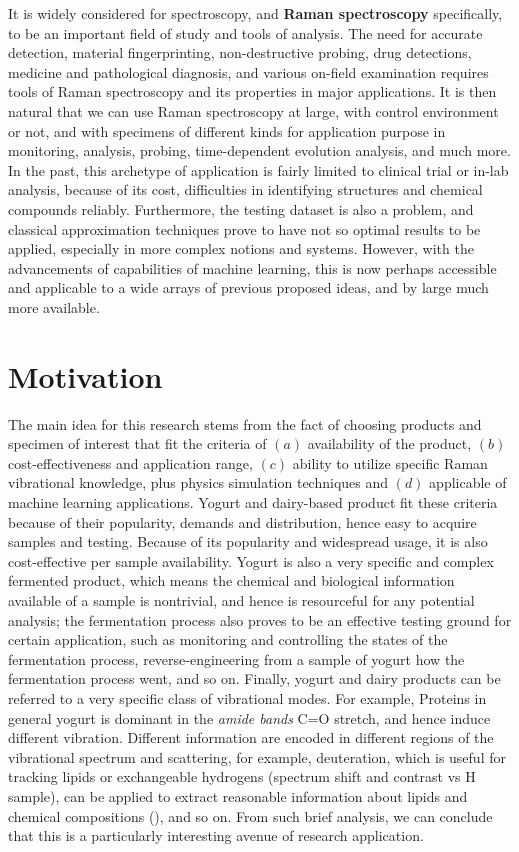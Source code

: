 \documentclass{iopjournal}
\begin{document}
It is widely considered for spectroscopy, and \textbf{Raman spectroscopy} specifically, to be an important field of study and tools of analysis. The need for accurate detection, material fingerprinting, non-destructive probing, drug detections, medicine and pathological diagnosis, and various on-field examination requires tools of Raman spectroscopy and its properties in major applications. It is then natural that we can use Raman spectroscopy at large, with control environment or not, and with specimens of different kinds for application purpose in monitoring, analysis, probing, time-dependent evolution analysis, and much more. In the past, this archetype of application is fairly limited to clinical trial or in-lab analysis, because of its cost, difficulties in identifying structures and chemical compounds reliably. Furthermore, the testing dataset is also a problem, and classical approximation techniques prove to have not so optimal results to be applied, especially in more complex notions and systems. However, with the advancements of capabilities of machine learning, this is now perhaps accessible and applicable to a wide arrays of previous proposed ideas, and by large much more available. 
\section{Motivation}

The main idea for this research stems from the fact of choosing products and specimen of interest that fit the criteria of $(a)$ availability of the product, $(b)$ cost-effectiveness and application range, $(c)$ ability to utilize specific Raman vibrational knowledge, plus physics simulation techniques and $(d)$ applicable of machine learning applications. Yogurt and dairy-based product fit these criteria because of their popularity, demands and distribution, hence easy to acquire samples and testing. Because of its popularity and widespread usage, it is also cost-effective per sample availability. Yogurt is also a very specific and complex fermented product, which means the chemical and biological information available of a sample is nontrivial, and hence is resourceful for any potential analysis; the fermentation process also proves to be an effective testing ground for certain application, such as monitoring and controlling the states of the fermentation process, reverse-engineering from a sample of yogurt how the fermentation process went, and so on. Finally, yogurt and dairy products can be referred to a very specific class of vibrational modes. For example, Proteins in general yogurt is dominant in the \textit{amide bands} C=O stretch, and hence induce different vibration. Different information are encoded in different regions of the vibrational spectrum and scattering, for example, deuteration, which is useful for tracking lipids or exchangeable hydrogens (spectrum shift and contrast vs H sample), can be applied to extract reasonable information about lipids and chemical compositions (\cite{XUE2012858}), and so on. From such brief analysis, we can conclude that this is a particularly interesting avenue of research application. 
\end{document}
